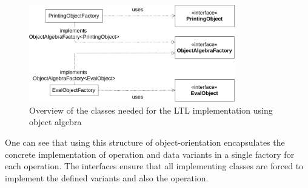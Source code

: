 \documentclass{llncs}
\begin{document}
%	


%	

\begin{figure}[h]
	\centering
	\includegraphics[width=0.8\textwidth]{img/OA-LTL-Implementation}
	\caption{Overview of the classes needed for the LTL implementation using object algebra}
	\label{fig:oa-ltl-implementation}
\end{figure} 

One can see that using this structure of object-orientation encapsulates the concrete implementation of operation and data variants in a single factory for each operation. The interfaces ensure that all implementing classes are forced to implement the defined variants and also the operation. 
\end{document}
